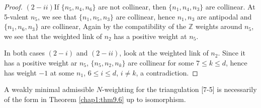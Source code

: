 \begin{proof}
\noindent
$(2-ii)$\pageoriginale If $\{ n_5, n_4, n_6 \}$ are not collinear,
then $\{ n_1, 
n_4, n_3 \}$ are collinear. At 5-valent $n_5$, we see that $\{
n_1, n_5, n_3 \}$ are collinear, hence $n_1, n_3$ are antipodal and
$\{ n_1, n_6, n_3 \}$ are collinear, Again by  the compatibility of
the $\mathbb{Z}$ weights around $n_5$, we see that the weighted link
of $n_2$ has a positive weight at $n_5$. 

In both cases $(2-i)$ and $(2-ii)$, look at the weighted link of
$n_2$. Since it has a positive weight ar $n_5$, $\{ n_5, n_2, n_k \}$
are collinear for some $7 \le k \le d$, hence has weight $-1$ at
some $n_1$, $6 \le i \le d$, $i \neq k$, a contradiction. 
\end{proof}

\begin{lemma}\label{chap1:lem9.13}
A weakly minimal admissible $N$-weighting for the triangulation
[7-5] is necessarily of the form in Theorem \ref{chap1:thm9.6} up to
isomorphism. 
\end{lemma}

